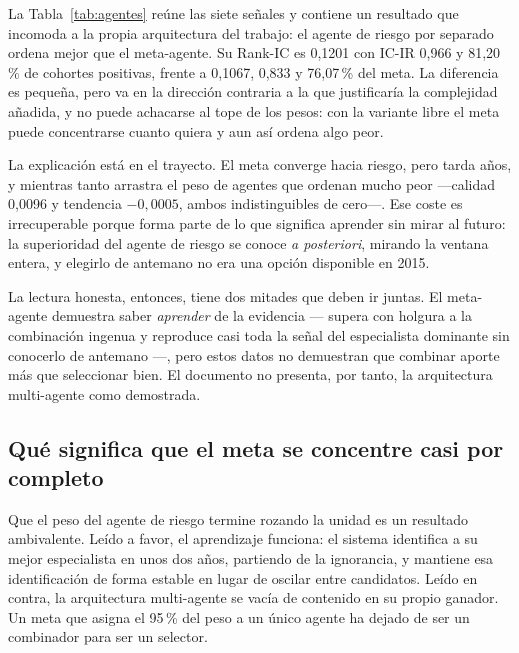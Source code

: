 \begin{table}[htbp]
  \centering
  \caption{Capacidad predictiva de los agentes y combinadores en 2015--2024.}
  \label{tab:agentes}
  
  \caption*{Desviación e IC-IR se calculan sobre cohortes cerradas de la ventana de selección.}
\end{table}

La Tabla~\ref{tab:agentes} reúne las siete señales y contiene un resultado que incomoda a la propia
arquitectura del trabajo: el agente de riesgo por separado ordena mejor que el meta-agente.
Su Rank-IC es 0,1201 con IC-IR 0,966 y 81,20\,\% de cohortes positivas, frente a 0,1067, 0,833 y
76,07\,\% del meta. La diferencia es pequeña, pero va en la dirección contraria a la que
justificaría la complejidad añadida, y no puede achacarse al tope de los pesos: con la variante
libre el meta puede concentrarse cuanto quiera y aun así ordena algo peor.

La explicación está en el trayecto. El meta converge hacia riesgo, pero tarda años, y mientras tanto
arrastra el peso de agentes que ordenan mucho peor ---calidad 0,0096 y tendencia $-0{,}0005$, ambos
indistinguibles de cero---. Ese coste es irrecuperable porque forma parte de lo que significa
aprender sin mirar al futuro: la superioridad del agente de riesgo se conoce \emph{a posteriori},
mirando la ventana entera, y elegirlo de antemano no era una opción disponible en 2015.

La lectura honesta, entonces, tiene dos mitades que deben ir juntas. El meta-agente demuestra saber
\emph{aprender} de la evidencia --- supera con holgura a la combinación ingenua y reproduce casi
toda la señal del especialista dominante sin conocerlo de antemano ---, pero estos datos no
demuestran que combinar aporte más que seleccionar bien. El documento no presenta, por tanto, la
arquitectura multi-agente como demostrada.

\subsection{Qué significa que el meta se concentre casi por completo}

Que el peso del agente de riesgo termine rozando la unidad es un resultado ambivalente. Leído a favor,
el aprendizaje funciona: el sistema identifica a su mejor especialista en unos dos años, partiendo
de la ignorancia, y mantiene esa identificación de forma estable en lugar de oscilar entre
candidatos. Leído en contra, la arquitectura multi-agente se vacía de contenido en su propio
ganador. Un meta que asigna el 95\,\% del peso a un único agente ha dejado de ser un combinador para
ser un selector.

